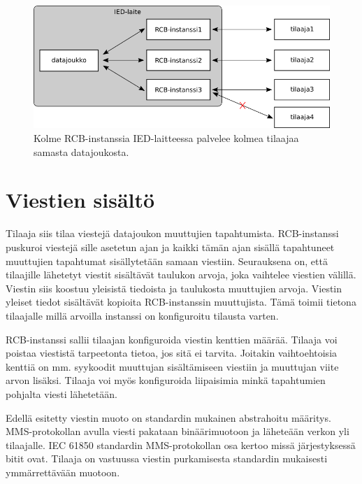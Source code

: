 \begin{figure}[ht!]
	\includegraphics[width=1\textwidth]{pictures/rcbs-to-one-dataset.png}
	\caption{Kolme RCB-instanssia IED-laitteessa palvelee kolmea tilaajaa samasta datajoukosta.}
	\label{fig:rcb-to-one-dataset}
\end{figure}


\section{Viestien sisältö}
Tilaaja siis tilaa viestejä datajoukon muuttujien tapahtumista. RCB-instanssi puskuroi viestejä sille asetetun ajan ja kaikki tämän ajan sisällä tapahtuneet muuttujien tapahtumat sisällytetään samaan viestiin. Seurauksena on, että tilaajille lähetetyt viestit sisältävät taulukon arvoja, joka vaihtelee viestien välillä. Viestin siis koostuu yleisistä tiedoista ja taulukosta muuttujien arvoja. Viestin yleiset tiedot sisältävät kopioita RCB-instanssin muuttujista. Tämä toimii tietona tilaajalle millä arvoilla instanssi on konfiguroitu tilausta varten. \mbox{\cite{IEC61850-7-1}} \mbox{\cite[s.~98]{IEC61850-7-2}}

RCB-instanssi sallii tilaajan konfiguroida viestin kenttien määrää. Tilaaja voi poistaa viestistä tarpeetonta tietoa, jos sitä ei tarvita. Joitakin vaihtoehtoisia kenttiä on mm. syykoodit muuttujan sisältämiseen viestiin ja muuttujan viite arvon lisäksi. Tilaaja voi myös konfiguroida liipaisimia minkä tapahtumien pohjalta viesti lähetetään. \mbox{\cite[s.~90]{IEC61850-7-1}} \mbox{\cite[s.~98]{IEC61850-7-2}}

Edellä esitetty viestin muoto on standardin mukainen abstrahoitu määritys. MMS-protokollan avulla viesti pakataan binäärimuotoon ja läheteään verkon yli tilaajalle. IEC 61850 standardin MMS-protokollan osa kertoo missä järjestyksessä bitit ovat. Tilaaja on vastuussa viestin purkamisesta standardin mukaisesti ymmärrettävään muotoon.


